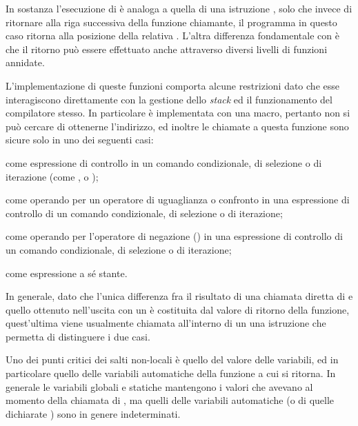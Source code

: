 In sostanza l'esecuzione di  è analoga a quella di una
istruzione , solo che invece di ritornare alla riga
successiva della funzione chiamante, il programma in questo caso ritorna alla
posizione della relativa . L'altra differenza fondamentale con
 è che il ritorno può essere effettuato anche attraverso
diversi livelli di funzioni annidate.

L'implementazione di queste funzioni comporta alcune restrizioni dato che esse
interagiscono direttamente con la gestione dello \textit{stack} ed il
funzionamento del compilatore stesso. In particolare  è
implementata con una macro, pertanto non si può cercare di ottenerne
l'indirizzo, ed inoltre le chiamate a questa funzione sono sicure solo in uno
dei seguenti casi:
\begin{itemize*}
\item come espressione di controllo in un comando condizionale, di selezione o
  di iterazione (come ,  o
  );
\item come operando per un operatore di uguaglianza o confronto in una
  espressione di controllo di un comando condizionale, di selezione o di
  iterazione;
\item come operando per l'operatore di negazione (\code{!}) in una espressione
  di controllo di un comando condizionale, di selezione o di iterazione;
\item come espressione a sé stante.
\end{itemize*}

In generale, dato che l'unica differenza fra il risultato di una chiamata
diretta di  e quello ottenuto nell'uscita con un  è
costituita dal valore di ritorno della funzione, quest'ultima viene usualmente
chiamata all'interno di un una istruzione  che permetta di
distinguere i due casi.

Uno dei punti critici dei salti non-locali è quello del valore delle
variabili, ed in particolare quello delle variabili automatiche della funzione
a cui si ritorna. In generale le variabili globali e statiche mantengono i
valori che avevano al momento della chiamata di , ma quelli
delle variabili automatiche (o di quelle dichiarate ) sono in
genere indeterminati.

